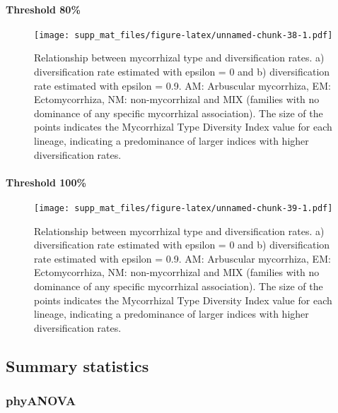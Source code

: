 \documentclass[]{article}
\let\oldparagraph\paragraph
\renewcommand{\paragraph}[1]{\oldparagraph{#1}\mbox{}}
\begin{document}
\pagebreak

\hypertarget{threshold-80-3}{%
\paragraph{Threshold 80\%}\label{threshold-80-3}}

\begin{figure}
\centering
\texttt{[image: supp\_mat\_files/figure-latex/unnamed-chunk-38-1.pdf]}
\caption{Relationship between mycorrhizal type and diversification
rates. a) diversification rate estimated with epsilon = 0 and b)
diversification rate estimated with epsilon = 0.9. AM: Arbuscular
mycorrhiza, EM: Ectomycorrhiza, NM: non-mycorrhizal and MIX (families
with no dominance of any specific mycorrhizal association). The size of
the points indicates the Mycorrhizal Type Diversity Index value for each
lineage, indicating a predominance of larger indices with higher
diversification rates.}
\end{figure}

\pagebreak

\hypertarget{threshold-100-3}{%
\paragraph{Threshold 100\%}\label{threshold-100-3}}

\begin{figure}
\centering
\texttt{[image: supp\_mat\_files/figure-latex/unnamed-chunk-39-1.pdf]}
\caption{Relationship between mycorrhizal type and diversification
rates. a) diversification rate estimated with epsilon = 0 and b)
diversification rate estimated with epsilon = 0.9. AM: Arbuscular
mycorrhiza, EM: Ectomycorrhiza, NM: non-mycorrhizal and MIX (families
with no dominance of any specific mycorrhizal association). The size of
the points indicates the Mycorrhizal Type Diversity Index value for each
lineage, indicating a predominance of larger indices with higher
diversification rates.}
\end{figure}

\pagebreak

\hypertarget{summary-statistics-3}{%
\subsection{Summary statistics}\label{summary-statistics-3}}

\hypertarget{phyanova-6}{%
\subsubsection{phyANOVA}\label{phyanova-6}}
\end{document}
